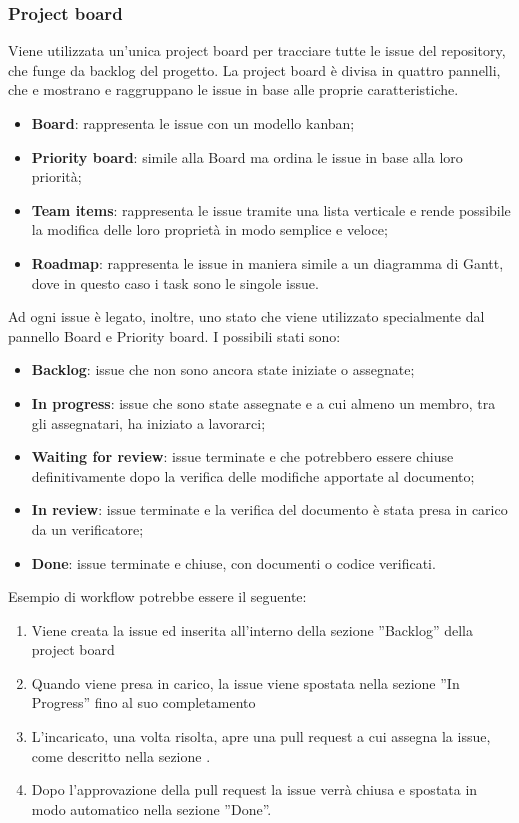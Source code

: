 \subsubsection{Project board}\label{inf:pb}
Viene utilizzata un'unica project board per tracciare tutte le issue del
repository, che funge da backlog del progetto. La project board è divisa in
quattro pannelli, che e mostrano e raggruppano le issue in base alle proprie
caratteristiche.
\begin{itemize}
    \item \textbf{Board}: rappresenta le issue con un modello kanban;
    \item \textbf{Priority board}: simile alla Board ma ordina le issue in base alla loro priorità;
    \item \textbf{Team items}: rappresenta le issue tramite una lista verticale e rende possibile
          la modifica delle loro proprietà in modo semplice e veloce;
    \item \textbf{Roadmap}: rappresenta le issue in maniera simile a un diagramma di Gantt,
          dove in questo caso i task sono le singole issue.
\end{itemize}
Ad ogni issue è legato, inoltre, uno stato che viene utilizzato specialmente dal pannello Board e Priority board.
I possibili stati sono:
\begin{itemize}
    \item \textbf{Backlog}: issue che non sono ancora state iniziate o assegnate;
    \item \textbf{In progress}: issue che sono state assegnate e a cui almeno un membro, tra gli assegnatari, ha iniziato a lavorarci;
    \item \textbf{Waiting for review}: issue terminate e che potrebbero essere chiuse definitivamente dopo la verifica delle modifiche apportate al documento;
    \item \textbf{In review}: issue terminate e la verifica del documento è stata presa in carico da un verificatore;
    \item \textbf{Done}: issue terminate e chiuse, con documenti o codice verificati.
\end{itemize}
Esempio di workflow potrebbe essere il seguente:
\begin{enumerate}
    \item Viene creata la issue ed inserita all'interno della sezione ”Backlog” della
          project board
    \item Quando viene presa in carico, la issue viene spostata nella sezione ”In
          Progress” fino al suo completamento
    \item L'incaricato, una volta risolta, apre una pull request a cui assegna la issue,
          come descritto nella sezione .
    \item Dopo l'approvazione della pull request la issue verrà chiusa e spostata in modo
          automatico nella sezione ”Done”.
\end{enumerate}

